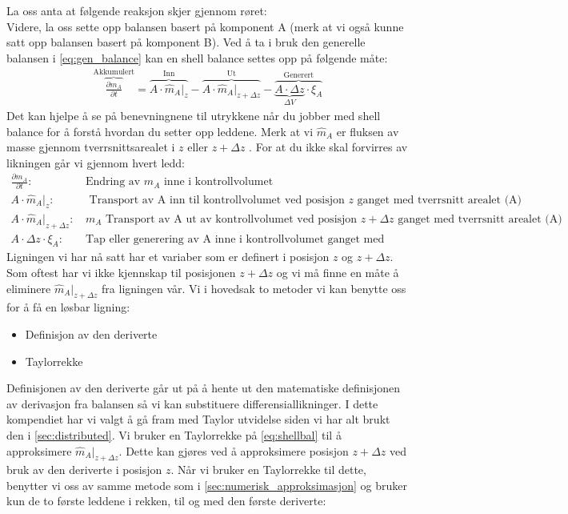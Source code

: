 La oss anta at følgende reaksjon skjer gjennom røret: \\
Videre, la oss sette opp balansen basert på komponent A (merk at vi også kunne satt opp balansen basert på komponent B). Ved å ta i bruk den generelle balansen i \cref{eq:gen_balance} kan en shell balance settes opp på følgende måte:
\begin{equation}
\begin{split}
\label{eq:shellbal}
    \overbrace{\frac{\partial m_A}{\partial t}}^{\text{Akkumulert}} = \overbrace{A \cdot \hat{m}_A\big|_z}^{\text{Inn}} - \overbrace{A \cdot \hat{m}_A\big|_{z+\Delta z}}^{\text{Ut}} - \overbrace{\underbrace{A \cdot \Delta z}_\text{$\Delta V$} \cdot \xi_A}^{\text{Generert}} 
\end{split}
\end{equation}
   Det kan hjelpe å se på benevningnene til utrykkene når du jobber med shell balance for å forstå hvordan du setter opp leddene. Merk at vi $\hat{m}_A$ er fluksen av masse gjennom tverrsnittsarealet i $z$ eller $z + \Delta z$ . For at du ikke skal forvirres av likningen går vi gjennom hvert ledd:
\begin{align*}
     \frac{\partial m_A}{\partial t}:&\, \text{Endring av }m_A\text{ inne i kontrollvolumet}\\
     A \cdot \hat{m}_A\big|_z:&\, \text{ Transport av A inn til kontrollvolumet ved posisjon }z\text{ ganget med tverrsnitt arealet (A)} \\
     A \cdot \hat{m}_A\big|_{z+\Delta z}:&\, m_A \text{ Transport av A ut av kontrollvolumet ved posisjon }z+\Delta z \text{ ganget med tverrsnitt arealet (A)} \\
     A\cdot \Delta z \cdot \xi_A:&\, \text{Tap eller generering av A inne i kontrollvolumet ganget med volumet av unit cellen} 
\end{align*}
Ligningen vi har nå satt har et variaber som er definert i posisjon $z$ og $z + \Delta z$. Som oftest har vi ikke kjennskap til posisjonen $z + \Delta z$ og vi må finne en måte å eliminere $\hat{m}_A\big|_{z+\Delta z}$ fra ligningen vår.
Vi i hovedsak to metoder vi kan benytte oss for å få en løsbar ligning:
\begin{itemize}
    \item Definisjon av den deriverte
    \item Taylorrekke
\end{itemize}
Definisjonen av den deriverte går ut på å hente ut den matematiske definisjonen av derivasjon fra balansen så vi kan substituere differensiallikninger. I dette kompendiet har vi valgt å gå fram med Taylor utvidelse siden vi har alt brukt den i \cref{sec:distributed}. Vi bruker en Taylorrekke på \cref{eq:shellbal} til å approksimere $\hat{m}_A\big|_{z+\Delta z}$. Dette kan gjøres ved å approksimere posisjon $z+\Delta z$ ved bruk av den deriverte i posisjon $z$. Når vi bruker en Taylorrekke til dette, benytter vi oss av samme metode som i \cref{sec:numerisk_approksimasjon} og bruker kun de to første leddene i rekken, til og med den første deriverte:
